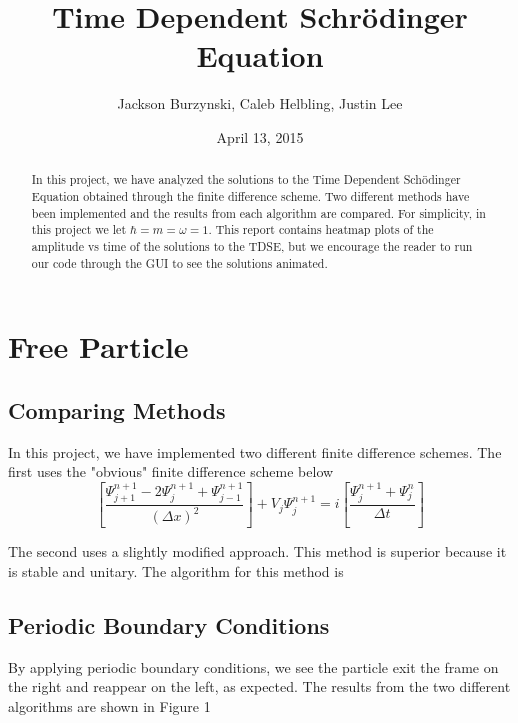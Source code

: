 \documentclass{article}
\begin{document}
\title{Time Dependent Schr\"{o}dinger Equation}
\author{Jackson Burzynski, Caleb Helbling, Justin Lee}
\date{April 13, 2015}

\maketitle

\begin{abstract}

In this project, we have analyzed the solutions to the Time Dependent Sch\"{o}dinger Equation obtained through the finite difference scheme. Two different methods have been implemented and the results from each algorithm are compared. For simplicity, in this project we let $\hbar = m = \omega = 1$. This report contains heatmap plots of the amplitude vs time of the solutions to the TDSE, but we encourage the reader to run our code through the GUI to see the solutions animated.

\end{abstract}

\section{Free Particle}

\subsection{Comparing Methods}

In this project, we have implemented two different finite difference schemes. The first uses the "obvious" finite difference scheme below
\begin{equation}
\left[ \frac{\Psi_{j+1}^{n+1} -2 \Psi_j^{n+1} + \Psi_{j-1}^{n+1}}{(\Delta x)^2} \right] + V_j \Psi_j^{n+1} = i \left[ \frac{\Psi_j^{n+1} + \Psi_j^n}{\Delta t} \right]
\end{equation}

The second uses a slightly modified approach. This method is superior because it is stable and unitary. The algorithm for this method is

%

\subsection{Periodic Boundary Conditions}

By applying periodic boundary conditions, we see the particle exit the frame on the right and reappear on the left, as expected. The results from the two 
different algorithms are shown in Figure 1
\end{document}
